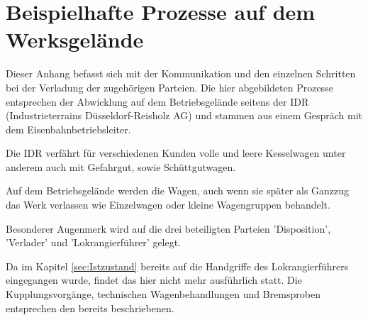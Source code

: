 \section{Beispielhafte Prozesse auf dem Werksgelände}\label{sec:realeIst}
Dieser Anhang befasst sich mit der Kommunikation und den einzelnen Schritten bei der Verladung der zugehörigen Parteien. Die hier abgebildeten Prozesse entsprechen der Abwicklung auf dem Betriebsgelände seitens der IDR (Industrieterrains Düsseldorf-Reisholz AG) und stammen aus einem Gespräch mit dem Eisenbahnbetriebsleiter.\cite{IDR}\par
Die IDR verfährt für verschiedenen Kunden volle und leere Kesselwagen unter anderem auch mit Gefahrgut, sowie Schüttgutwagen. \par
Auf dem Betriebsgelände werden die Wagen, auch wenn sie später als Ganzzug das Werk verlassen wie Einzelwagen oder kleine Wagengruppen behandelt.\par
Besonderer Augenmerk wird auf die drei beteiligten Parteien 'Disposition', 'Verlader' und 'Lokrangierführer' gelegt.\par
Da im Kapitel \ref{sec:Istzustand} bereits auf die Handgriffe des Lokrangierführers eingegangen wurde, findet das hier nicht mehr ausführlich statt. Die Kupplungsvorgänge, technischen Wagenbehandlungen und Bremsproben entsprechen den bereits beschriebenen.

